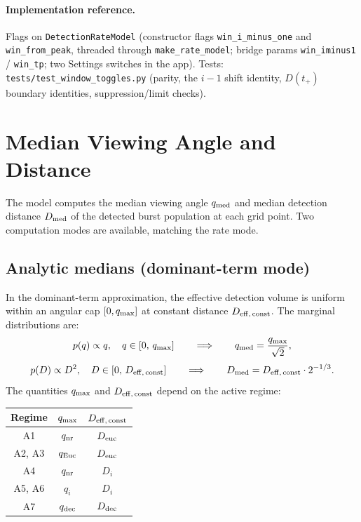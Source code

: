 \documentclass[11pt,a4paper]{article}
\begin{document}
\begingroup\raggedright \paragraph{Implementation reference.} Flags on \texttt{DetectionRateModel} (constructor flags \texttt{win\_i\_minus\_one} and \texttt{win\_from\_peak}, threaded through \texttt{make\_rate\_model}; bridge params \texttt{win\_iminus1} / \texttt{win\_tp}; two Settings switches in the app). Tests: \texttt{tests/test\_window\_toggles.py} (parity, the $i\!-\!1$ shift identity, $D(t_+)$ boundary identities, suppression/limit checks).\par\endgroup

\section{Median Viewing Angle and Distance}

The model computes the median viewing angle $q_{\rm med}$ and median detection distance $D_{\rm med}$ of the detected burst population at each grid point. Two computation modes are available, matching the rate mode.

\subsection{Analytic medians (dominant-term mode)}

In the dominant-term approximation, the effective detection volume is uniform within an angular cap $[0,q_{\rm max}]$ at constant distance $D_{\rm eff,\,const}$. The marginal distributions are:
\[
p(q)\propto q, \quad q\in[0,\,q_{\rm max}]\qquad\Longrightarrow\qquad q_{\rm med} = \frac{q_{\rm max}}{\sqrt{2}},
\]
\[
p(D)\propto D^2, \quad D\in[0,\,D_{\rm eff,\,const}]\qquad\Longrightarrow\qquad D_{\rm med} = D_{\rm eff,\,const}\cdot 2^{-1/3}.
\]
The quantities $q_{\rm max}$ and $D_{\rm eff,\,const}$ depend on the active regime:

\begin{table}[h]
\centering
\small
\renewcommand{\arraystretch}{1.3}
\begin{tabular}{ccc}
\toprule
Regime & $q_{\rm max}$ & $D_{\rm eff,\,const}$ \\
\midrule
A1 & $q_{\rm nr}$ & $D_{\rm euc}$ \\
A2, A3 & $q_{\rm Euc}$ & $D_{\rm euc}$ \\
A4 & $q_{\rm nr}$ & $D_i$ \\
A5, A6 & $q_i$ & $D_i$ \\
A7 & $q_{\rm dec}$ & $D_{\rm dec}$ \\
\bottomrule
\end{tabular}
\end{table}
\end{document}
